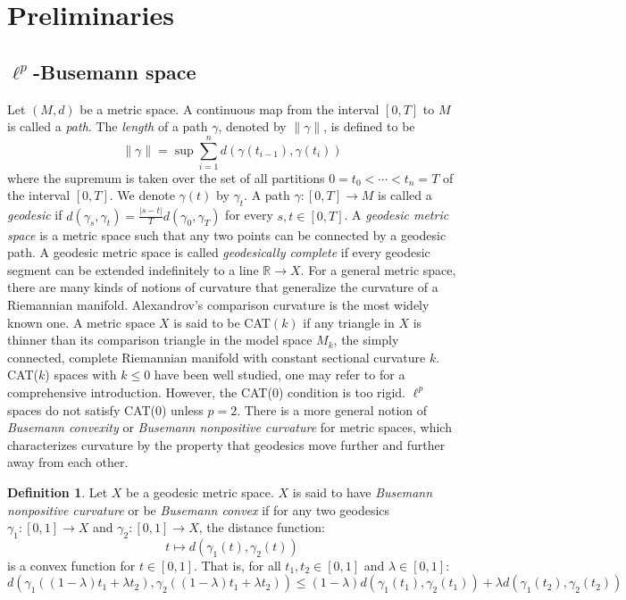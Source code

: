 \documentclass{article}
\theoremstyle{plain}
\theoremstyle{definition}
\newtheorem{definition}[theorem]{Definition}
\theoremstyle{remark}
\begin{document}
	\section{Preliminaries}
	\subsection{$\ell^p$-Busemann space}
	
	Let $(M,d)$ be a metric space. A continuous map from the interval $[0,T]$ to $M$ is called a \emph{path}. The \emph{length} of a path $\gamma$, denoted by $\|\gamma\|$, is defined to be
	$$\|\gamma\|=\sup\sum_{i=1}^nd(\gamma(t_{i-1}),\gamma(t_i))$$
	where the supremum is taken over the set of all partitions $0=t_0< \cdots < t_n = T$ of the interval $[0,T]$. We denote $\gamma(t)$ by $\gamma_t$. A path $\gamma:[0,T]\to M$ is called a \emph{geodesic} if $d(\gamma_s,\gamma_t)=\frac{|s-t|}{T}d(\gamma_0,\gamma_T)$ for every $s,t\in [0,T]$. A \emph{geodesic metric space} is a metric space such that any two points can be connected by a geodesic path. A geodesic metric space is called \emph{geodesically complete} if every geodesic segment can be extended indefinitely to a line $\mathbb{R} \to X$. For a general metric space, there are many kinds of notions of curvature that generalize the curvature of a Riemannian manifold. Alexandrov's comparison curvature is the most widely known one. A metric space $X$ is said to be CAT$(k)$ if any triangle in $X$ is thinner than its comparison triangle in the model space $M_k$, the simply connected, complete Riemannian manifold with constant sectional curvature $k$. CAT($k$) spaces with $k\leq 0$ have been well studied, one may refer to \cite{bridson2013metric} for a comprehensive introduction. However, the CAT($0$) condition is too rigid. $\ell^p$ spaces do not satisfy CAT($0$) unless $p=2$. There is a more general notion of \emph{Busemann convexity} or \emph{Busemann nonpositive curvature} for metric spaces, which characterizes curvature by the property that geodesics move further and further away from each other.
	\begin{definition}
		Let $X$ be a geodesic metric space. $X$ is said to have \emph{Busemann nonpositive curvature} or be \emph{Busemann convex} if for any two geodesics $\gamma_1: [0, 1] \to X$ and $\gamma_2: [0, 1] \to X$, the distance function: $$t \longmapsto d(\gamma_1(t), \gamma_2(t))$$ is a convex function for $t \in [0, 1]$. That is, for all $t_1, t_2 \in [0, 1]$ and $\lambda \in [0, 1]$:
		$$d\left(\gamma_1\left((1-\lambda)t_1 + \lambda t_2\right), \gamma_2\left((1-\lambda)t_1 + \lambda t_2\right)\right) \le (1-\lambda)d(\gamma_1(t_1), \gamma_2(t_1)) + \lambda d(\gamma_1(t_2), \gamma_2(t_2))$$
	\end{definition}
\end{document}
